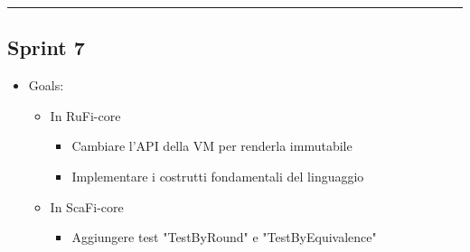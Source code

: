 \documentclass[12pt, a4paper]{article}
\begin{document}
\par\noindent\rule{\textwidth}{0.5pt}


\subsection*{Sprint 7}

\begin{itemize}
    \item Goals:
          \begin{itemize}
              \color{teal}
              \item In RuFi-core
                    \begin{itemize}
                        \item Cambiare l'API della VM per renderla immutabile
                        \item Implementare i costrutti fondamentali del linguaggio
                    \end{itemize}
                    \color{cyan}
              \item In ScaFi-core
                    \begin{itemize}
                        \item Aggiungere test "TestByRound" e "TestByEquivalence"
                    \end{itemize}
                    \color{blue}


\end{itemize}
\end{itemize}
\end{document}
